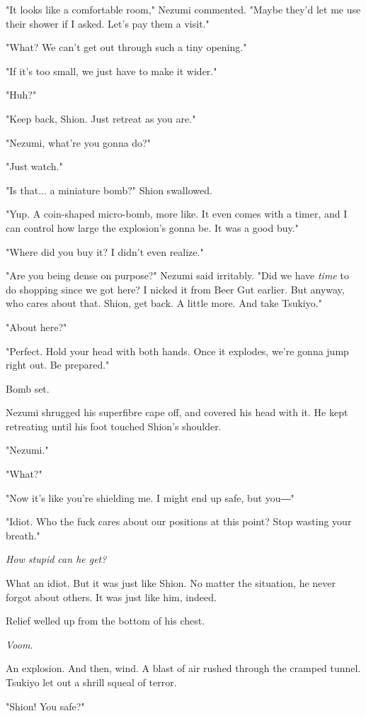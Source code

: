 "It looks like a comfortable room," Nezumi commented. "Maybe they'd let
me use their shower if I asked. Let's pay them a visit."

"What? We can't get out through such a tiny opening."

"If it's too small, we just have to make it wider."

"Huh?"

"Keep back, Shion. Just retreat as you are."

"Nezumi, what're you gonna do?"

"Just watch."

"Is that... a miniature bomb?" Shion swallowed.

"Yup. A coin-shaped micro-bomb, more like. It even comes with a timer,
and I can control how large the explosion's gonna be. It was a good
buy."

"Where did you buy it? I didn't even realize."

"Are you being dense on purpose?" Nezumi said irritably. "Did we have
\emph{time} to do shopping since we got here? I nicked it from Beer Gut
earlier. But anyway, who cares about that. Shion, get back. A little
more. And take Tsukiyo."

"About here?"

"Perfect. Hold your head with both hands. Once it explodes, we're gonna
jump right out. Be prepared."

Bomb set.

Nezumi shrugged his superfibre cape off, and covered his head with it.
He kept retreating until his foot touched Shion's shoulder.

"Nezumi."

"What?"

"Now it's like you're shielding me. I might end up safe, but you―"

"Idiot. Who the fuck cares about our positions at this point? Stop
wasting your breath."

\emph{How stupid can he get?}

What an idiot. But it was just like Shion. No matter the situation, he
never forgot about others. It was just like him, indeed.

Relief welled up from the bottom of his chest.

\emph{Voom.}

An explosion. And then, wind. A blast of air rushed through the cramped
tunnel. Tsukiyo let out a shrill squeal of terror.

"Shion! You safe?"

